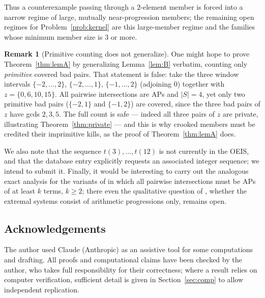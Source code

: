 \documentclass[11pt]{article}
\theoremstyle{definition}
\newtheorem{remark}[theorem]{Remark}
\begin{document}
Thus a counterexample passing through a $2$-element member is forced into a narrow regime of large, mutually near-progression members; the remaining open regimes for Problem~\ref{prob:kernel} are this large-member regime and the families whose minimum member size is $3$ or more.

\begin{remark}[Primitive counting does not generalize]\label{rem:cex}
One might hope to prove Theorem~\ref{thm:lemA} by generalizing Lemma~\ref{lem:B} verbatim, counting only \emph{primitive} covered bad pairs. That statement is false: take the three window intervals $\{-2,\dots,2\}$, $\{-2,\dots,1\}$, $\{-1,\dots,2\}$ (adjoining $0$) together with $z=\{0,6,10,15\}$. All pairwise intersections are APs and $|S|=4$, yet only two primitive bad pairs ($\{-2,1\}$ and $\{-1,2\}$) are covered, since the three bad pairs of $z$ have gcds $2,3,5$. The full count is safe --- indeed all three pairs of $z$ are private, illustrating Theorem~\ref{thm:private} --- and this is why crooked members must be credited their imprimitive kills, as the proof of Theorem~\ref{thm:lemA} does.
\end{remark}

We also note that the sequence $t(3),\dots,t(12)$ is not currently in the OEIS, and that the database entry \cite{EP272} explicitly requests an associated integer sequence; we intend to submit it. Finally, it would be interesting to carry out the analogous exact analysis for the variants of \cite{SiSo81} in which all pairwise intersections must be APs of at least $k$ terms, $k\ge2$; there even the qualitative question of \cite{SiSo81,Sz99}, whether the extremal systems consist of arithmetic progressions only, remains open.

\subsection*{Acknowledgements}
The author used Claude (Anthropic) as an assistive tool for some computations and drafting. All proofs and computational claims have been checked by the author, who takes full responsibility for their correctness; where a result relies on computer verification, sufficient detail is given in Section~\ref{sec:comp} to allow independent replication.
\end{document}
